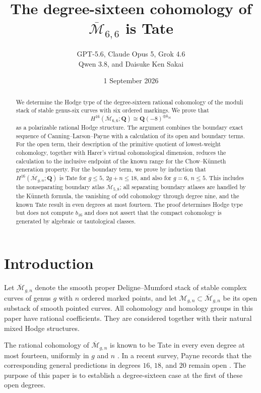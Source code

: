 \documentclass[12pt,reqno]{amsart}
\title[Degree-sixteen cohomology of $\Mbar_{6,6}$]
  {The degree-sixteen cohomology of $\overline{\mathcal M}_{6,6}$ is Tate}
\author[GPT-5.6 et al.]
  {GPT-5.6, Claude Opus 5, Grok 4.6\\
   Qwen 3.8, and Daisuke Ken Sakai}
\date{1 September 2026}
\newcommand{\Q}{\mathbf{Q}}
\newcommand{\M}{\mathcal{M}}
\newcommand{\Mbar}{\overline{\mathcal{M}}}
\theoremstyle{definition}
\theoremstyle{remark}
\begin{document}
\begin{abstract}
We determine the Hodge type of the degree-sixteen rational cohomology of the
moduli stack of stable genus-six curves with six ordered markings.  We prove
that
\[
  H^{16}(\Mbar_{6,6};\Q)\cong\Q(-8)^{\oplus b_{16}}
\]
as a polarizable rational Hodge structure.  The argument combines the
boundary exact sequence of Canning--Larson--Payne with a calculation of its
open and boundary terms.  For the open term, their description of the
primitive quotient of lowest-weight cohomology, together with Harer's virtual
cohomological dimension, reduces the calculation to the inclusive endpoint
of the known range for the Chow--K\"unneth generation property.  For the
boundary term, we
prove by induction that $H^{16}(\Mbar_{g,n};\Q)$ is Tate for
$g\leq5$, $2g+n\leq18$, and also for $g=6$, $n\leq5$.  This includes the
nonseparating boundary atlas $\Mbar_{5,8}$; all separating boundary atlases
are handled by the K\"unneth formula, the vanishing of odd cohomology through
degree nine, and the known Tate result in even degrees at most fourteen.
The proof determines Hodge type but does not compute $b_{16}$ and does not
assert that the compact cohomology is generated by algebraic or tautological
classes.
\end{abstract}

\maketitle

\section{Introduction}

Let $\Mbar_{g,n}$ denote the smooth proper Deligne--Mumford stack of stable
complex curves of genus $g$ with $n$ ordered marked points, and let
$\M_{g,n}\subset\Mbar_{g,n}$ be its open substack of smooth pointed curves.
All cohomology and homology groups in this paper have rational coefficients.
They are considered together with their natural mixed Hodge structures.

The rational cohomology of $\Mbar_{g,n}$ is known to be Tate in every even
degree at most fourteen, uniformly in $g$ and $n$
\cite[Theorem~1.5(3) and the discussion following it]{CLP}.  In a recent
survey, Payne records that the corresponding general predictions in degrees
$16$, $18$, and $20$ remain open \cite[Section~4]{PayneSurvey}.  The purpose
of this paper is to establish a degree-sixteen case at the first of these
open degrees.
\end{document}
